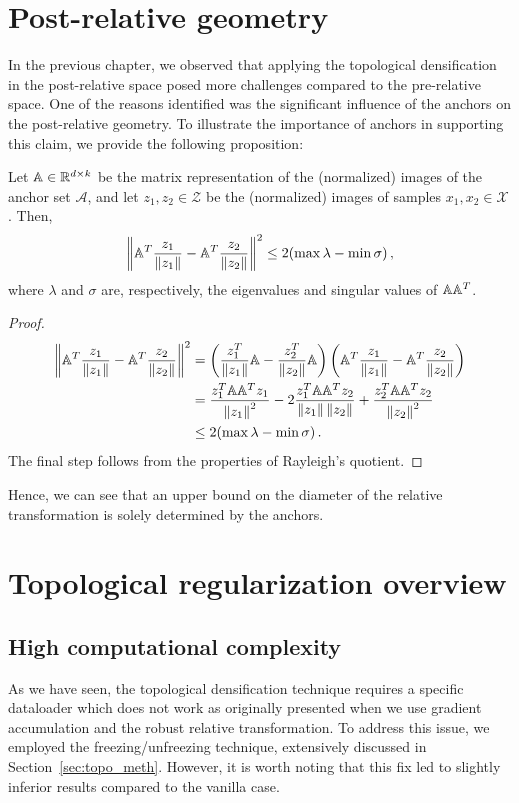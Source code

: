 \documentclass[../main.tex]{subfiles}
\begin{document}
\section{Post-relative geometry}
In the previous chapter, we observed that applying the topological densification in the post-relative space posed more challenges compared to the pre-relative space. One of the reasons identified was the significant influence of the anchors on the post-relative geometry. To illustrate the importance of anchors in supporting this claim, we provide the following proposition:

\begin{proposition}
Let $\mathbb{A}\in \mathbb{R}^{d \times k}$ be the matrix representation of the (normalized) images of the anchor set $\mathcal{A}$, and let $z_1, z_2 \in \mathcal{Z}$ be the (normalized) images of samples $x_1, x_2 \in \mathcal{X}$. Then,
\[
\left\lVert \mathbb{A}^T\frac{z_1}{\left\lVert z_1 \right\rVert} - \mathbb{A}^T\frac{z_2}{\left\lVert z_2 \right\rVert} \right\rVert^2 \leq 2(\max \lambda - \min \sigma)\,,
\]
where $\lambda$ and $\sigma$ are, respectively, the eigenvalues and singular values of $\mathbb{A}\mathbb{A}^T$.
\end{proposition}
\begin{proof}
    \begin{align*}
        \left\lVert \mathbb{A}^T\frac{z_1}{\left\lVert z_1 \right\rVert} - \mathbb{A}^T\frac{z_2}{\left\lVert z_2 \right\rVert} \right\rVert^2 &= \left(\frac{z_1^T}{\left\lVert z_1 \right\rVert}\mathbb{A} - \frac{z_2^T}{\left\lVert z_2 \right\rVert}\mathbb{A}\right)\left(\mathbb{A}^T\frac{z_1}{\left\lVert z_1 \right\rVert} - \mathbb{A}^T\frac{z_2}{\left\lVert z_2 \right\rVert}\right)\\
        &=\frac{z_1^T\mathbb{A}\mathbb{A}^Tz_1}{\left\lVert z_1 \right\rVert^2} -2\frac{z_1^T\mathbb{A}\mathbb{A}^Tz_2}{\left\lVert z_1 \right\rVert\left\lVert z_2 \right\rVert}+ \frac{z_2^T\mathbb{A}\mathbb{A}^Tz_2}{\left\lVert z_2 \right\rVert^2}\\
        &\leq 2(\max \lambda - \min \sigma)\,.
    \end{align*}
The final step follows from the properties of Rayleigh's quotient.
\end{proof}

Hence, we can see that an upper bound on the diameter of the relative transformation is solely determined by the anchors.


\section{Topological regularization overview}
\label{sec:more_topo}

\subsection{High computational complexity}
As we have seen, the topological densification technique requires a specific dataloader which does not work as originally presented when we use gradient accumulation and the robust relative transformation. To address this issue, we employed the freezing/unfreezing technique, extensively discussed in Section~\ref{sec:topo_meth}. However, it is worth noting that this fix led to slightly inferior results compared to the vanilla case.\\
\end{document}
